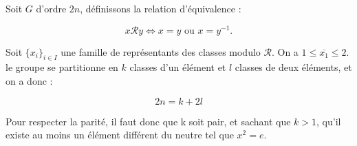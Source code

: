 Soit $G$ d'ordre $2n$, définissons la relation d'équivalence :

\[x \mathcal{R} y \Leftrightarrow x=y \text{ ou } x = y^{-1}.\]

Soit $\{x_i\}_{i\in I}$ une famille de représentants des classes modulo $\mathcal{R}$.
On a $1 \leq \overline{x_1} \leq 2$. le groupe se partitionne en $k$ classes d'un élément et $l$ classes de deux éléments, et on a donc :

\[2n = k + 2l\]

Pour respecter la parité, il faut donc que k soit pair, et sachant que $k>1$, qu'il existe au moins un élément différent du neutre tel que $x^2=e$.